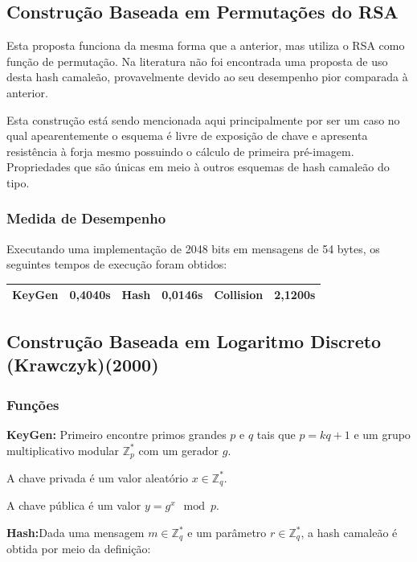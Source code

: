 \documentclass[a4paper]{article}
\begin{document}
\subsection{Construção Baseada em Permutações do RSA}

Esta proposta funciona da mesma forma que a anterior, mas utiliza o
RSA como função de permutação. Na literatura não foi encontrada uma
proposta de uso desta hash camaleão, provavelmente devido ao seu
desempenho pior comparada à anterior. 

Esta construção está sendo mencionada aqui principalmente por ser um
caso no qual apearentemente o esquema é livre de exposição de chave e
apresenta resistência à forja mesmo possuindo o cálculo de primeira
pré-imagem. Propriedades que são únicas em meio à outros esquemas de
hash camaleão do tipo.

\subsubsection{Medida de Desempenho}

Executando uma implementação de 2048 bits em mensagens de 54 bytes, os
seguintes tempos de execução foram obtidos:

\begin{center}
\begin{tabular}{|c|c|c|c|c|c|}
  \hline
  KeyGen & 0,4040s & Hash & 0,0146s & Collision & 2,1200s\\
  \hline
\end{tabular}
\end{center}

\subsection{Construção Baseada em Logaritmo Discreto (Krawczyk)(2000)
  \cite{krawczyk}}

\subsubsection{Funções}

\textbf{KeyGen: }Primeiro encontre primos grandes $p$ e $q$ tais que
$p = kq+1$ e um grupo multiplicativo modular $\mathbb{Z}^{*}_p$ com um
gerador $g$.

A chave privada é um valor aleatório $x \in \mathbb{Z}^{*}_q$.

A chave pública é um valor $y = g^x \mod p$.

\textbf{Hash:}Dada uma mensagem $m \in \mathbb{Z}^{*}_q$ e um
parâmetro $r\in \mathbb{Z}^{*}_q$, a hash camaleão é obtida por meio
da definição:
\end{document}
